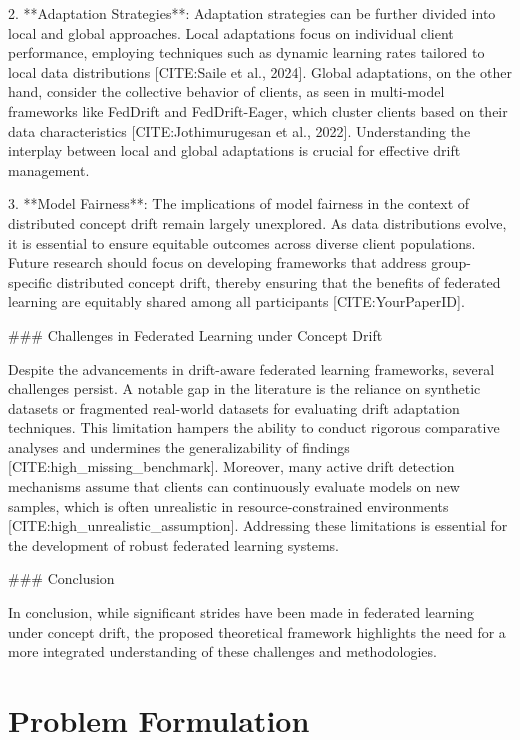 \documentclass[journal]{IEEEtran}
\begin{document}
2. **Adaptation Strategies**: Adaptation strategies can be further divided into local and global approaches. Local adaptations focus on individual client performance, employing techniques such as dynamic learning rates tailored to local data distributions [CITE:Saile et al., 2024]. Global adaptations, on the other hand, consider the collective behavior of clients, as seen in multi-model frameworks like FedDrift and FedDrift-Eager, which cluster clients based on their data characteristics [CITE:Jothimurugesan et al., 2022]. Understanding the interplay between local and global adaptations is crucial for effective drift management.

3. **Model Fairness**: The implications of model fairness in the context of distributed concept drift remain largely unexplored. As data distributions evolve, it is essential to ensure equitable outcomes across diverse client populations. Future research should focus on developing frameworks that address group-specific distributed concept drift, thereby ensuring that the benefits of federated learning are equitably shared among all participants [CITE:YourPaperID].

\#\#\# Challenges in Federated Learning under Concept Drift

Despite the advancements in drift-aware federated learning frameworks, several challenges persist. A notable gap in the literature is the reliance on synthetic datasets or fragmented real-world datasets for evaluating drift adaptation techniques. This limitation hampers the ability to conduct rigorous comparative analyses and undermines the generalizability of findings [CITE:high_missing_benchmark]. Moreover, many active drift detection mechanisms assume that clients can continuously evaluate models on new samples, which is often unrealistic in resource-constrained environments [CITE:high_unrealistic_assumption]. Addressing these limitations is essential for the development of robust federated learning systems.

\#\#\# Conclusion

In conclusion, while significant strides have been made in federated learning under concept drift, the proposed theoretical framework highlights the need for a more integrated understanding of these challenges and methodologies.

\section{Problem Formulation}
\label{sec:problem_formulation}
\end{document}
